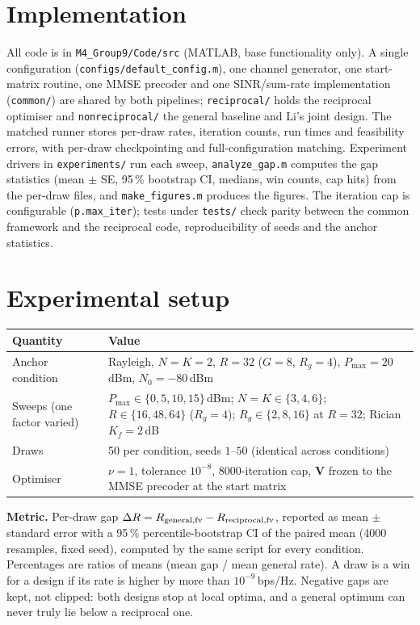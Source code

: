 \documentclass[10pt,a4paper]{article}
\newcommand{\bpsHz}{bps/Hz}
\newcommand{\file}[1]{\texttt{\small #1}}
\begin{document}
\section{Implementation}
All code is in \file{M4\_Group9/Code/src} (MATLAB, base functionality only). A single configuration (\file{configs/default\_config.m}), one channel generator, one start-matrix routine, one MMSE precoder and one SINR/sum-rate implementation (\file{common/}) are shared by both pipelines; \file{reciprocal/} holds the reciprocal optimiser and \file{nonreciprocal/} the general baseline and Li's joint design. The matched runner stores per-draw rates, iteration counts, run times and feasibility errors, with per-draw checkpointing and full-configuration matching. Experiment drivers in \file{experiments/} run each sweep, \file{analyze\_gap.m} computes the gap statistics (mean $\pm$ SE, 95\,\% bootstrap CI, medians, win counts, cap hits) from the per-draw files, and \file{make\_figures.m} produces the figures. The iteration cap is configurable (\texttt{p.max\_iter}); tests under \file{tests/} check parity between the common framework and the reciprocal code, reproducibility of seeds and the anchor statistics.

\section{Experimental setup}
\begin{table}[H]\centering\small
\begin{tabular}{@{}ll@{}}\toprule
Quantity & Value\\\midrule
Anchor condition & Rayleigh, $N{=}K{=}2$, $R{=}32$ ($G{=}8$, $R_g{=}4$), $P_{\max}=20$\,dBm, $N_0=-80$\,dBm\\
Sweeps (one factor varied) & $P_{\max}\in\{0,5,10,15\}$\,dBm; $N{=}K\in\{3,4,6\}$; $R\in\{16,48,64\}$ ($R_g{=}4$); $R_g\in\{2,8,16\}$ at $R{=}32$; Rician $K_f=2$\,dB\\
Draws & 50 per condition, seeds $1$--$50$ (identical across conditions)\\
Optimiser & $\nu=1$, tolerance $10^{-8}$, 8000-iteration cap, $\mathbf V$ frozen to the MMSE precoder at the start matrix\\\bottomrule
\end{tabular}
\end{table}
\textbf{Metric.} Per-draw gap $\Delta R=R_{\rm general,fv}-R_{\rm reciprocal,fv}$, reported as mean $\pm$ standard error with a 95\,\% percentile-bootstrap CI of the paired mean (4000 resamples, fixed seed), computed by the same script for every condition. Percentages are ratios of means (mean gap / mean general rate). A draw is a win for a design if its rate is higher by more than $10^{-9}$\,\bpsHz. Negative gaps are kept, not clipped: both designs stop at local optima, and a general optimum can never truly lie below a reciprocal one.
\end{document}
